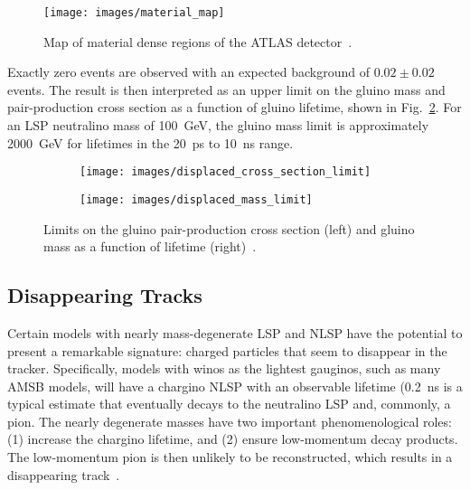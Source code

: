 \documentclass[12pt]{article}
\begin{document}
        \noindent \begin{figure}[htbp] \begin{center}
        \texttt{[image: images/material\_map]}
        \caption{Map of material dense regions of the ATLAS detector~\cite{atlas_displaced}.}
        \label{material_map}
        \end{center} \end{figure}

        Exactly zero events are observed with an expected background of $\num{0.02} \pm \num{0.02}$ events. The result is then interpreted as an upper limit on the gluino mass and pair-production cross section as a function of gluino lifetime, shown in Fig.~\ref{displaced_limit}. For an LSP neutralino mass of \SI{100}{\giga\electronvolt}, the gluino mass limit is approximately \SI{2000}{\giga\electronvolt} for lifetimes in the \SI{20}{\pico\s} to \SI{10}{\nano\s} range.

        \noindent \begin{figure}[htbp] \begin{center}
        \begin{subfigure}[htbp]{0.45\textwidth} \begin{center}
        \texttt{[image: images/displaced\_cross\_section\_limit]}
        \end{center} \end{subfigure}
        \begin{subfigure}[htbp]{0.45\textwidth} \begin{center}
        \texttt{[image: images/displaced\_mass\_limit]}
        \end{center} \end{subfigure}
        \caption{Limits on the gluino pair-production cross section (left) and gluino mass as a function of lifetime (right)~\cite{atlas_displaced}.}
        \label{displaced_limit}
        \end{center} \end{figure}

    \subsection{Disappearing Tracks}
        Certain models with nearly mass-degenerate LSP and NLSP have the potential to present a remarkable signature: charged particles that seem to disappear in the tracker. Specifically, models with winos as the lightest gauginos, such as many AMSB models, will have a chargino NLSP with an observable lifetime (\SI{0.2}{\nano\s} is a typical estimate that eventually decays to the neutralino LSP and, commonly, a pion. The nearly degenerate masses have two important phenomenological roles: (1) increase the chargino lifetime, and (2) ensure low-momentum decay products. The low-momentum pion is then unlikely to be reconstructed, which results in a disappearing track~\cite{atlas_disappearing}.
\end{document}
